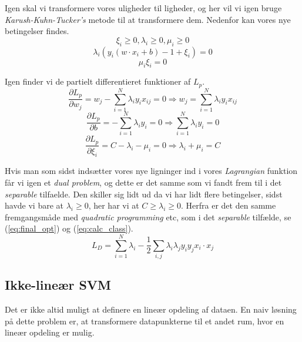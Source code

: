 \documentclass{article}
\begin{document}
Igen skal vi transformere vores uligheder til ligheder, og her vil vi igen bruge \textit{Karush-Kuhn-Tucker's} metode til at transformere dem. Nedenfor kan vores nye betingelser findes.
\begin{equation}
\label{eq:slack_constraint_lambda_i1}
\xi_i \geq 0, \lambda_i \geq 0, \mu_i \geq 0
\end{equation}
\begin{equation}
\label{eq:slack_constraint_lambda_i2}
\lambda_i(y_i(w \cdot x_i + b) - 1 + \xi_i) = 0
\end{equation}
\begin{equation}
\label{eq:slack_constraint_lambda_i3}
\mu_i \xi_i = 0
\end{equation}

Igen finder vi de partielt differentieret funktioner af $L_p$.
\begin{equation}
\label{eq:slack_partial_L_pw}
\frac{\partial L_p}{\partial w_j} = w_j - \sum\limits_{i=1}^N \lambda_i y_i x_{ij} = 0 \Rightarrow w_j = \sum\limits_{i=1}^N \lambda_i y_i x_{ij}
\end{equation}
\begin{equation}
\label{eq:slack_partial_L_pb}
\frac{\partial L_p}{\partial b} = - \sum\limits_{i=1}^N \lambda_i y_i = 0 \Rightarrow \sum\limits_{i=1}^N \lambda_i y_i = 0
\end{equation}
\begin{equation}
\label{eq:slack_partial_L_pxi}
\frac{\partial L_p}{\partial \xi_i} = C - \lambda_i - \mu_i = 0 \Rightarrow \lambda_i + \mu_i = C
\end{equation}

Hvis man som sidst indsætter vores nye ligninger ind i vores \textit{Lagrangian} funktion får vi igen et \textit{dual problem}, og dette er det samme som vi fandt frem til i det \textit{separable} tilfaelde. Den skiller sig lidt ud da vi har lidt flere betingelser, sidst havde vi bare at $\lambda_i \geq 0$, her har vi at $C \geq \lambda_i \geq 0$. Herfra er det den samme fremgangsmåde med \textit{quadratic programming} etc, som i det \textit{separable} tilfælde, se (\ref{eq:final_opt}) og (\ref{eq:calc_class}).
\begin{equation}
\label{eq:slack_L_D}
L_D = \sum\limits_{i=1}^N \lambda_i - \frac{1}{2}\sum\limits_{i,j}\lambda_i \lambda_j y_i y_j x_i \cdot x_j
\end{equation}

\subsection{Ikke-lineær SVM}
Det er ikke altid muligt at definere en lineær opdeling af dataen. En naiv løsning på dette problem er, at transformere datapunkterne til et andet rum, hvor en lineær opdeling er mulig.
\end{document}
